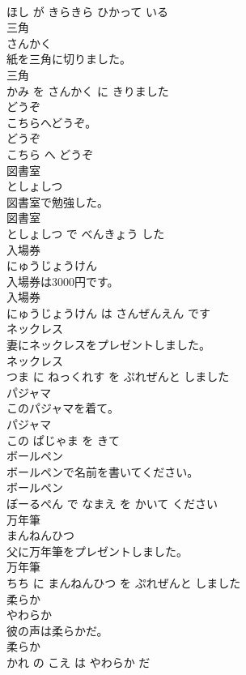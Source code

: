 \documentclass[8pt]{extreport}
\begin{document}
\begin{CJK}{UTF8}{min}
\\	ほし が きらきら ひかって いる			
\\	三角	
\\	さんかく			
\\	紙を三角に切りました。	
\\	三角 
\\	かみ を さんかく に きりました			
\\	どうぞ	
\\	こちらへどうぞ。	
\\	どうぞ 
\\	こちら へ どうぞ			
\\	図書室	
\\	としょしつ			
\\	図書室で勉強した。	
\\	図書室 
\\	としょしつ で べんきょう した			
\\	入場券	
\\	にゅうじょうけん			
\\	入場券は3000円です。	
\\	入場券 
\\	にゅうじょうけん は さんぜんえん です			
\\	ネックレス	
\\	妻にネックレスをプレゼントしました。	
\\	ネックレス 
\\	つま に ねっくれす を ぷれぜんと しました			
\\	パジャマ	
\\	このパジャマを着て。	
\\	パジャマ 
\\	この ぱじゃま を きて			
\\	ボールペン	
\\	ボールペンで名前を書いてください。	
\\	ボールペン 
\\	ぼーるぺん で なまえ を かいて ください			
\\	万年筆	
\\	まんねんひつ			
\\	父に万年筆をプレゼントしました。	
\\	万年筆 
\\	ちち に まんねんひつ を ぷれぜんと しました			
\\	柔らか	
\\	やわらか			
\\	彼の声は柔らかだ。	
\\	柔らか 
\\	かれ の こえ は やわらか だ			

\end{CJK}
\end{document}
